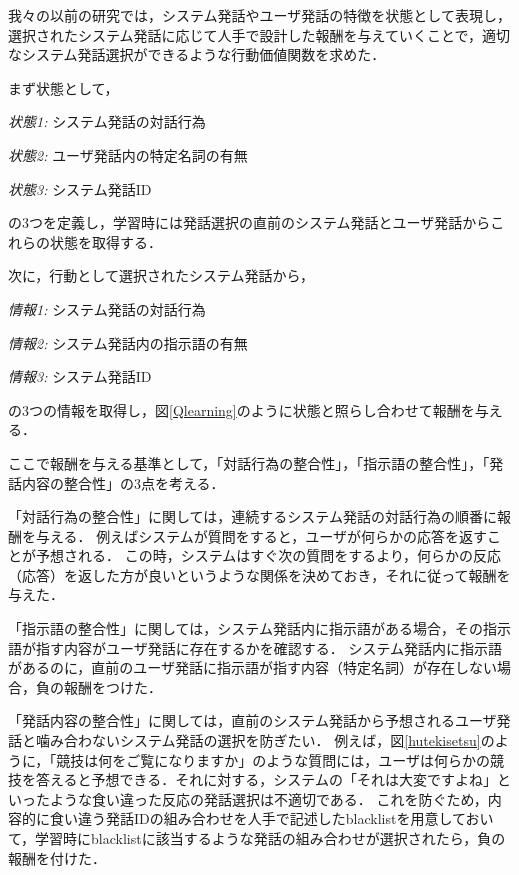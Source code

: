 \documentclass[a4j,dvipdfmx]{jarticle}
\begin{document}
我々の以前の研究では，システム発話やユーザ発話の特徴を状態として表現し，選択されたシステム発話に応じて人手で設計した報酬を与えていくことで，適切なシステム発話選択ができるような行動価値関数を求めた．

まず状態として，
\begin{description}\item{\emph{状態1: }}システム発話の対話行為\item{\emph{状態2: }}ユーザ発話内の特定名詞の有無\item{\emph{状態3: } }システム発話ID\end{description}
の3つを定義し，学習時には発話選択の直前のシステム発話とユーザ発話からこれらの状態を取得する．

次に，行動として選択されたシステム発話から，
\begin{description}\item{\emph{情報1: }}システム発話の対話行為\item{\emph{情報2: }}システム発話内の指示語の有無\item{\emph{情報3: }}システム発話ID\end{description}
の3つの情報を取得し，図\ref{Qlearning}のように状態と照らし合わせて報酬を与える．

ここで報酬を与える基準として，「対話行為の整合性」，「指示語の整合性」，「発話内容の整合性」の3点を考える．

「対話行為の整合性」に関しては，連続するシステム発話の対話行為の順番に報酬を与える．
例えばシステムが質問をすると，ユーザが何らかの応答を返すことが予想される．
この時，システムはすぐ次の質問をするより，何らかの反応（応答）を返した方が良いというような関係を決めておき，それに従って報酬を与えた．

「指示語の整合性」に関しては，システム発話内に指示語がある場合，その指示語が指す内容がユーザ発話に存在するかを確認する．
システム発話内に指示語があるのに，直前のユーザ発話に指示語が指す内容（特定名詞）が存在しない場合，負の報酬をつけた．

「発話内容の整合性」に関しては，直前のシステム発話から予想されるユーザ発話と噛み合わないシステム発話の選択を防ぎたい．
例えば，図\ref{hutekisetsu}のように，「競技は何をご覧になりますか」のような質問には，ユーザは何らかの競技を答えると予想できる．それに対する，システムの「それは大変ですよね」といったような食い違った反応の発話選択は不適切である．
これを防ぐため，内容的に食い違う発話IDの組み合わせを人手で記述したblacklistを用意しておいて，学習時にblacklistに該当するような発話の組み合わせが選択されたら，負の報酬を付けた．
\end{document}
